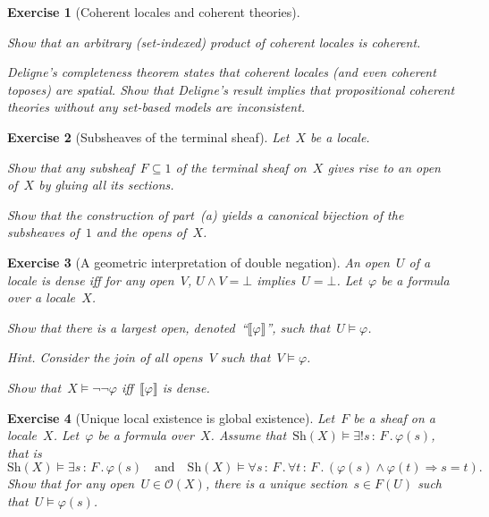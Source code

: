 \documentclass{ws-rv9x6}
\newtheorem{ex}{Exercise}
\newenvironment{exercise}[1]{
  \begin{ex}[#1]
}{\end{ex}}
\renewcommand{\O}{\mathcal{O}}
\newcommand{\Sh}{\mathrm{Sh}}
\renewcommand{\_}{\mathpunct{.}}
\newcommand{\?}{\,{:}\,}
\begin{document}
\begin{exercise}{Coherent locales and coherent theories}
\begin{alphlist}[(d)]
\item Show that an arbitrary (set-indexed) product of coherent locales is
coherent.

\item \emph{Deligne's completeness theorem} states that coherent locales (and
even coherent \emph{toposes}) are spatial. Show that Deligne's
result implies that propositional coherent theories
without any set-based models are inconsistent.
\end{alphlist}
\end{exercise}

\begin{exercise}{Subsheaves of the terminal sheaf}%
\label{ex:subsheaves-1}%
Let~$X$ be a locale.
\begin{alphlist}[(b)]
\item Show that any subsheaf~$F \subseteq 1$ of the terminal sheaf on~$X$ gives rise
to an open of~$X$ by gluing all its sections.
\item Show that the construction of part~(a) yields a canonical bijection of
the subsheaves of~$1$ and the opens of~$X$.
\end{alphlist}
\end{exercise}

\begin{exercise}{A geometric interpretation of double negation}%
An open~$U$ of a locale is \emph{dense} iff for any open~$V$, $U \wedge V =
\bot$ implies~$U = \bot$. Let~$\varphi$ be a formula over a locale~$X$.
\begin{alphlist}[(b)]
\item Show that there is a largest open,
denoted~``$\llbracket\varphi\rrbracket$'', such that~$U \models \varphi$.\smallskip

{\scriptsize\emph{Hint.} Consider the join of all opens~$V$ such that~$V
\models \varphi$.\par}

\item Show that~$X \models \neg\neg\varphi$ iff~$\llbracket\varphi\rrbracket$
is dense.
\end{alphlist}
\end{exercise}

\begin{exercise}{Unique local existence is global existence}%
\label{ex:global-existence}%
Let~$F$ be a sheaf on a locale~$X$. Let~$\varphi$ be a formula over~$X$. Assume
that~$\Sh(X) \models \exists!s\?F\_ \varphi(s)$, that is
\[ \Sh(X) \models \exists s\?F\_ \varphi(s) \quad\text{and}\quad
  \Sh(X) \models \forall s\?F\_ \forall t\?F\_ (\varphi(s) \wedge \varphi(t)
  \Rightarrow s = t). \]
Show that for any open~$U \in \O(X)$, there is a unique section~$s \in F(U)$
such that~$U \models \varphi(s)$.
\end{exercise}
\end{document}
